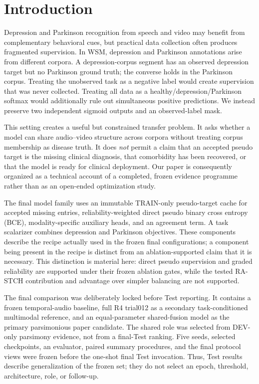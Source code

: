 \section{Introduction}
\label{sec:intro}

Depression and Parkinson recognition from speech and video may benefit from complementary behavioral cues, but practical data collection often produces fragmented supervision. In WSM, depression and Parkinson annotations arise from different corpora. A depression-corpus segment has an observed depression target but no Parkinson ground truth; the converse holds in the Parkinson corpus. Treating the unobserved task as a negative label would create supervision that was never collected. Treating all data as a healthy/depression/Parkinson softmax would additionally rule out simultaneous positive predictions. We instead preserve two independent sigmoid outputs and an observed-label mask.

This setting creates a useful but constrained transfer problem. It asks whether a model can share audio--video structure across corpora without treating corpus membership as disease truth. It does \emph{not} permit a claim that an accepted pseudo target is the missing clinical diagnosis, that comorbidity has been recovered, or that the model is ready for clinical deployment. Our paper is consequently organized as a technical account of a completed, frozen evidence programme rather than as an open-ended optimization study.

The final model family uses an immutable TRAIN-only pseudo-target cache for accepted missing entries, reliability-weighted direct pseudo binary cross entropy (BCE), modality-specific auxiliary heads, and an agreement term. A task scalarizer combines depression and Parkinson objectives. These components describe the recipe actually used in the frozen final configurations; a component being present in the recipe is distinct from an ablation-supported claim that it is necessary. This distinction is material here: direct pseudo supervision and graded reliability are supported under their frozen ablation gates, while the tested RA-STCH contribution and advantage over simpler balancing are not supported.

The final comparison was deliberately locked before Test reporting. It contains a frozen temporal-audio baseline, full R4 trial012 as a secondary task-conditioned multimodal reference, and an equal-parameter shared-fusion model as the primary parsimonious paper candidate. The shared role was selected from DEV-only parsimony evidence, not from a final-Test ranking. Five seeds, selected checkpoints, an evaluator, paired summary procedures, and the final protocol views were frozen before the one-shot final Test invocation. Thus, Test results describe generalization of the frozen set; they do not select an epoch, threshold, architecture, role, or follow-up.

